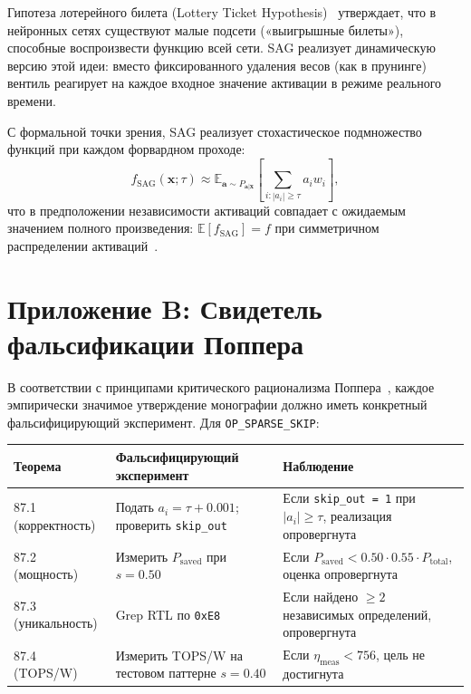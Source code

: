Гипотеза лотерейного билета (Lottery Ticket Hypothesis)~\cite{frankle2018lottery}
утверждает, что в нейронных сетях существуют малые подсети
(«выигрышные билеты»), способные воспроизвести функцию всей сети.
SAG реализует динамическую версию этой идеи: вместо фиксированного
удаления весов (как в прунинге) вентиль реагирует на каждое
входное значение активации в режиме реального времени.

С формальной точки зрения, SAG реализует стохастическое
подмножество функций при каждом форвардном проходе:
\begin{equation}
  f_{\text{SAG}}(\mathbf{x}; \tau) \approx
  \mathbb{E}_{\mathbf{a} \sim P_{\mathbf{a}|\mathbf{x}}}
  \left[\sum_{i : |a_i| \geq \tau} a_i w_i\right],
  \label{eq:lottery-connection}
\end{equation}
что в предположении независимости активаций совпадает
с ожидаемым значением полного произведения:
$\mathbb{E}[f_{\text{SAG}}] = f$ при симметричном распределении
активаций~\cite{hoefler2021sparsity}.


\section*{Приложение B: Свидетель фальсификации Поппера}
\label{sec:glava87-popper-b}

В соответствии с принципами критического рационализма
Поппера~\cite{popper1959,popper_conjectures}, каждое эмпирически
значимое утверждение монографии должно иметь конкретный
фальсифицирующий эксперимент.  Для \texttt{OP\_SPARSE\_SKIP}:

\begin{center}
\begin{tabular}{p{3cm}p{5cm}p{5cm}}
  \hline
  Теорема & Фальсифицирующий эксперимент & Наблюдение \\
  \hline
  87.1 (корректность) &
  Подать $a_i = \tau + 0{.}001$; проверить \texttt{skip\_out} &
  Если \texttt{skip\_out = 1} при $|a_i| \geq \tau$,
  реализация опровергнута \\
  87.2 (мощность) &
  Измерить $P_{\mathrm{saved}}$ при $s = 0{.}50$ &
  Если $P_{\mathrm{saved}} < 0{.}50 \cdot 0{.}55 \cdot P_{\mathrm{total}}$,
  оценка опровергнута \\
  87.3 (уникальность) &
  Grep RTL по \verb|0xE8| &
  Если найдено $\geq 2$ независимых определений, опровергнута \\
  87.4 (TOPS/W) &
  Измерить TOPS/W на тестовом паттерне $s = 0{.}40$ &
  Если $\eta_{\mathrm{meas}} < 756$, цель не достигнута \\
  \hline
\end{tabular}
\end{center}

